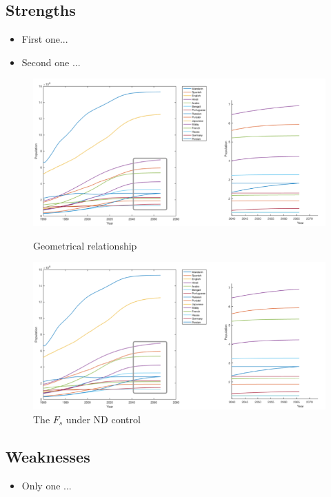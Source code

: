 \documentclass[12pt]{article}  %
\begin{document}
\subsection{Strengths}
\begin{itemize}
    \item First one...
    \item Second one ...
\end{itemize}
\begin{figure}[htbp]
	\begin{minipage}{0.45\linewidth}
		\centering
		\includegraphics[width=\textwidth]{p3.png}
		\caption{Geometrical relationship} 
		\label{fig:beta}
	\end{minipage}
	\begin{minipage}{0.45\linewidth}
		\centering
		\includegraphics[width=\textwidth]{p3.png}
		\caption{The $F_s$ under ND control}
		\label{fig:Force_plane}
	\end{minipage}
\end{figure} 

\subsection{Weaknesses}
\begin{itemize}
    \item Only one ...
 \end{itemize}
\end{document}
